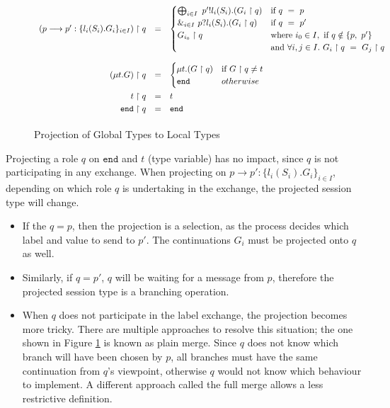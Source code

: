 \documentclass[12pt,twoside]{report}
\begin{document}
\begin{figure}[h]
    \centering
    \begin{equation*}
    \centering
    \begin{array}{rcl}
        
        (p \longrightarrow p':\{l_i(S_i).G_i\}_{i \in I}) \upharpoonright q & = &
        \begin{cases}
            \bigoplus_{i \in I}\ p'!l_i(S_i).(G_i \upharpoonright q) & \text{if}\ q\ =\ p\\
            \&_{i \in I}\ p?l_i(S_i).(G_i \upharpoonright q) & \text{if}\ q\ =\ p'\\
            G_{i_0} \upharpoonright q & \text{where}\ i_0 \in I,\ \text{if}\ q \notin \{p,\ p'\}\\
            & \text{and}\ \forall i,j \in I.\ G_i \upharpoonright q\ =\ G_j \upharpoonright q
        \end{cases}\\[33pt]
        (\mu t.G) \upharpoonright q & = & 
        \begin{cases}
            \mu t.(G \upharpoonright q) & \text{if}\ G \upharpoonright q \neq t\\
            \texttt{end} & otherwise
        \end{cases}\\[13pt]
        t \upharpoonright q & = & t\\[2.75pt]
        \texttt{end} \upharpoonright q & = & \texttt{end}\\[2.75pt]
        \end{array}
    \end{equation*}
    \caption{Projection of Global Types to Local Types}
    \label{MPST_projection}
\end{figure}{}

Projecting a role $q$ on $\texttt{end}$ and $t$ (type variable) has no impact, since $q$ is not participating in any exchange. When projecting on $p \longrightarrow p':\{l_i(S_i).G_i\}_{i \in I}$, depending on which role $q$ is undertaking in the exchange, the projected session type will change. 
\begin{itemize}
    \item If the $q = p$, then the projection is a selection, as the process decides which label and value to send to $p'$. The continuations $G_i$ must be projected onto $q$ as well.
    \item Similarly, if $q = p'$, $q$ will be waiting for a message from $p$, therefore the projected session type is a branching operation. 
    \item  When $q$ does not participate in the label exchange, the projection becomes more tricky. There are multiple approaches to resolve this situation; the one shown in Figure \ref{MPST_projection} is known as plain merge. Since $q$ does not know which branch will have been chosen by $p$, all branches must have the same continuation from $q$'s viewpoint, otherwise $q$ would not know which behaviour to implement. A different approach called the full merge allows a less restrictive definition\cite{verygentleintrotompst}.
    
\end{itemize}
\end{document}
